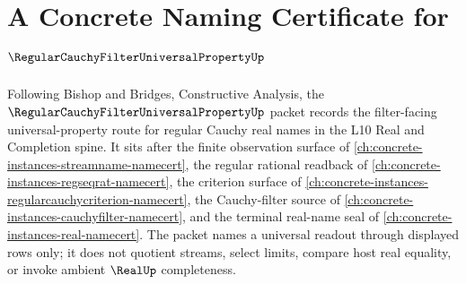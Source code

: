 \chapter{A Concrete Naming Certificate for $\RegularCauchyFilterUniversalPropertyUp$}
\label{ch:concrete-instances-regular-cauchy-filter-universal-property-namecert}

Following Bishop and Bridges, Constructive Analysis, the $\RegularCauchyFilterUniversalPropertyUp$ packet records the filter-facing universal-property route for regular Cauchy real names in the L10 Real and Completion spine. It sits after the finite observation surface of \autoref{ch:concrete-instances-streamname-namecert}, the regular rational readback of \autoref{ch:concrete-instances-regseqrat-namecert}, the criterion surface of \autoref{ch:concrete-instances-regularcauchycriterion-namecert}, the Cauchy-filter source of \autoref{ch:concrete-instances-cauchyfilter-namecert}, and the terminal real-name seal of \autoref{ch:concrete-instances-real-namecert}. The packet names a universal readout through displayed rows only; it does not quotient streams, select limits, compare host real equality, or invoke ambient $\RealUp$ completeness.

